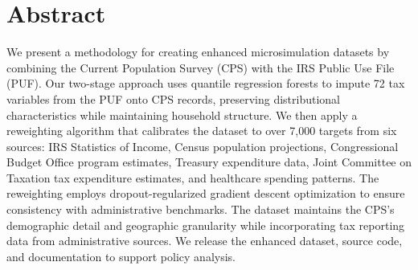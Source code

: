 \section*{Abstract}

We present a methodology for creating enhanced microsimulation datasets by combining the Current Population Survey (CPS) with the IRS Public Use File (PUF). Our two-stage approach uses quantile regression forests to impute 72 tax variables from the PUF onto CPS records, preserving distributional characteristics while maintaining household structure. We then apply a reweighting algorithm that calibrates the dataset to over 7,000 targets from six sources: IRS Statistics of Income, Census population projections, Congressional Budget Office program estimates, Treasury expenditure data, Joint Committee on Taxation tax expenditure estimates, and healthcare spending patterns. The reweighting employs dropout-regularized gradient descent optimization to ensure consistency with administrative benchmarks. The dataset maintains the CPS's demographic detail and geographic granularity while incorporating tax reporting data from administrative sources. We release the enhanced dataset, source code, and documentation to support policy analysis.